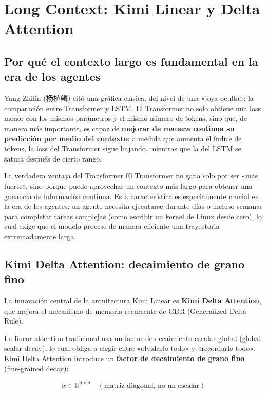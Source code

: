\section{Long Context: Kimi Linear y Delta Attention}

\subsection{Por qué el contexto largo es fundamental en la era de los agentes}

Yang Zhilin (杨植麟) citó una gráfica clásica, del nivel de una «joya oculta»: la comparación entre Transformer y LSTM. El Transformer no solo obtiene una loss menor con los mismos parámetros y el mismo número de tokens, sino que, de manera más importante, es capaz de \textbf{mejorar de manera continua su predicción por medio del contexto}: a medida que aumenta el índice de tokens, la loss del Transformer sigue bajando, mientras que la del LSTM se satura después de cierto rango.

\begin{knowledgebox}{La verdadera ventaja del Transformer}
El Transformer no gana solo por ser «más fuerte», sino porque puede aprovechar un contexto más largo para obtener una ganancia de información continua. Esta característica es especialmente crucial en la era de los agentes: un agente necesita ejecutarse durante días o incluso semanas para completar tareas complejas (como escribir un kernel de Linux desde cero), lo cual exige que el modelo procese de manera eficiente una trayectoria extremadamente larga.
\end{knowledgebox}

\subsection{Kimi Delta Attention: decaimiento de grano fino}

La innovación central de la arquitectura Kimi Linear es \textbf{Kimi Delta Attention}, que mejora el mecanismo de memoria recurrente de GDR (Generalized Delta Rule).

La linear attention tradicional usa un factor de decaimiento escalar global (global scalar decay), lo cual obliga a elegir entre «olvidarlo todo» y «recordarlo todo». Kimi Delta Attention introduce un \textbf{factor de decaimiento de grano fino} (fine-grained decay):

$$\alpha \in \mathbb{R}^{d \times d} \quad (\text{matriz diagonal, no un escalar})$$

